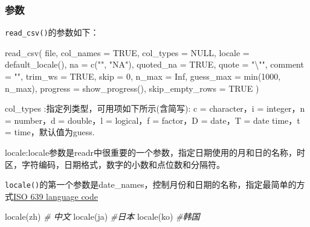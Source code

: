 \documentclass[
]{book}
\newenvironment{Shaded}{\begin{snugshade}}{\end{snugshade}}
\newcommand{\AttributeTok}[1]{\textcolor[rgb]{0.77,0.63,0.00}{#1}}
\newcommand{\CommentTok}[1]{\textcolor[rgb]{0.56,0.35,0.01}{\textit{#1}}}
\newcommand{\ConstantTok}[1]{\textcolor[rgb]{0.00,0.00,0.00}{#1}}
\newcommand{\DecValTok}[1]{\textcolor[rgb]{0.00,0.00,0.81}{#1}}
\newcommand{\FunctionTok}[1]{\textcolor[rgb]{0.00,0.00,0.00}{#1}}
\newcommand{\NormalTok}[1]{#1}
\newcommand{\SpecialCharTok}[1]{\textcolor[rgb]{0.00,0.00,0.00}{#1}}
\newcommand{\StringTok}[1]{\textcolor[rgb]{0.31,0.60,0.02}{#1}}
\begin{document}
\hypertarget{ux53c2ux6570}{%
\subsubsection{参数}\label{ux53c2ux6570}}

\texttt{read\_csv()}的参数如下：

\begin{Shaded}
\begin{Highlighting}[]
\FunctionTok{read\_csv}\NormalTok{(}
\NormalTok{  file,}
  \AttributeTok{col\_names =} \ConstantTok{TRUE}\NormalTok{,}
  \AttributeTok{col\_types =} \ConstantTok{NULL}\NormalTok{,}
  \AttributeTok{locale =} \FunctionTok{default\_locale}\NormalTok{(),}
  \AttributeTok{na =} \FunctionTok{c}\NormalTok{(}\StringTok{""}\NormalTok{, }\StringTok{"NA"}\NormalTok{),}
  \AttributeTok{quoted\_na =} \ConstantTok{TRUE}\NormalTok{,}
  \AttributeTok{quote =} \StringTok{"}\SpecialCharTok{\textbackslash{}"}\StringTok{"}\NormalTok{,}
  \AttributeTok{comment =} \StringTok{""}\NormalTok{,}
  \AttributeTok{trim\_ws =} \ConstantTok{TRUE}\NormalTok{,}
  \AttributeTok{skip =} \DecValTok{0}\NormalTok{,}
  \AttributeTok{n\_max =} \ConstantTok{Inf}\NormalTok{,}
  \AttributeTok{guess\_max =} \FunctionTok{min}\NormalTok{(}\DecValTok{1000}\NormalTok{, n\_max),}
  \AttributeTok{progress =} \FunctionTok{show\_progress}\NormalTok{(),}
  \AttributeTok{skip\_empty\_rows =} \ConstantTok{TRUE}
\NormalTok{)}
\end{Highlighting}
\end{Shaded}

col\_types :指定列类型，可用项如下所示(含简写):
c = character，i = integer，n = number，d = double，l = logical，f = factor，D = date，T = date time，t = time，默认值为guess.

locale:locale参数是readr中很重要的一个参数，指定日期使用的月和日的名称，时区，字符编码，日期格式，数字的小数和点位数和分隔符。

\texttt{locale()}的第一个参数是date\_names，控制月份和日期的名称，指定最简单的方式\href{https://en.wikipedia.org/wiki/List_of_ISO_639-1_codes}{ISO 639 language code}

\begin{Shaded}
\begin{Highlighting}[]
\FunctionTok{locale}\NormalTok{(}\StringTok{\textquotesingle{}zh\textquotesingle{}}\NormalTok{) }\CommentTok{\# 中文}
\FunctionTok{locale}\NormalTok{(}\StringTok{\textquotesingle{}ja\textquotesingle{}}\NormalTok{) }\CommentTok{\#日本}
\FunctionTok{locale}\NormalTok{(}\StringTok{\textquotesingle{}ko\textquotesingle{}}\NormalTok{) }\CommentTok{\#韩国}
\end{Highlighting}
\end{Shaded}
\end{document}
